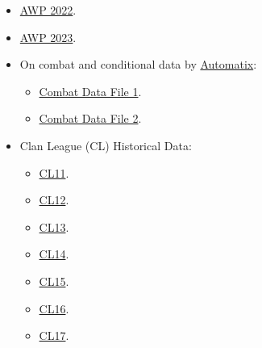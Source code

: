 \begin{itemize}
    \item \href{https://docs.google.com/spreadsheets/d/1wZNnU6gsXsncW9K4b7ejUBacTKlxioeMr2AJtI_ne4w/edit?usp=sharing}{AWP 2022}.
    \item \href{https://docs.google.com/spreadsheets/d/15Mg3tNqS-25h-IgE3L8Sc-XYxNtR0MvjqziaiKPhIHs/edit#gid=733990375}{AWP 2023}.
    \item On combat and conditional data by \href{https://www.warzone.com/Profile?p=8245968289&u=Automatix_1}{Automatix}: 
    \begin{itemize}
        \item \href{https://drive.google.com/file/d/1Q-CttvGAVVZFUquF6PwiSASvUyB0NmlK/view}{Combat Data File 1}.
        \item \href{https://drive.google.com/file/d/1nBl4mGbEvRqgApCXwB9jOJnX5Fhn_jdu/view}{Combat Data File 2}.
    \end{itemize}
    \item Clan League (CL) Historical Data:
    \begin{itemize}
        \item \href{https://docs.google.com/spreadsheets/d/17B-tlWBvzqJ4_86RijeOqKHe2cbQNwlhChKsw5W5ByI/edit#gid=1570514738}{CL11}.
        \item \href{https://docs.google.com/spreadsheets/d/1gLYmzkBke_t1Xvwr9gyZiw8FUMdikeV5DxJOGj16fzM/edit#gid=1014622740}{CL12}.
        \item \href{https://docs.google.com/spreadsheets/d/1RpIMi16M8CBSioEAQmZNsGqAC3kMoIYsutHIWS_7e64/edit#gid=1014622740}{CL13}.
        \item \href{https://docs.google.com/spreadsheets/d/1-M-IGtNTlpuVhHO4RlQQjEIEDUF-5ln91xQH5DB6Pwk/edit#gid=1578016673}{CL14}.
        \item \href{https://docs.google.com/spreadsheets/d/1DAeG0gE0QXSE_JYEH6prEH7mCe-ey6pKFANY7_7Qlf0/edit#gid=1014622740}{CL15}.
        \item \href{https://docs.google.com/spreadsheets/d/1oVI29Qupn9jqAZ1eBbzvewCjzlDTZZsdBkYLAOy6crs/edit#gid=1976460130}{CL16}.
        \item \href{https://docs.google.com/spreadsheets/d/1ZG0CoSA9RDswzvmYpc3Qtq-NPCtRRiQaXa8_l_jgS1k/edit#gid=1105097664}{CL17}.
    \end{itemize}
\end{itemize}
\normalsize